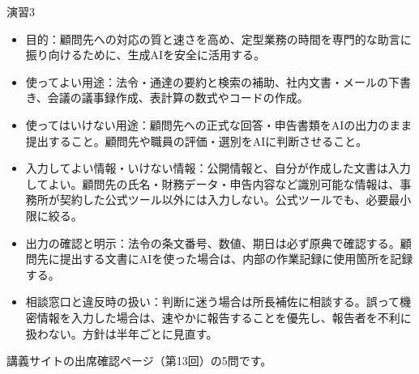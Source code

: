 \begin{answer}{演習3}
\begin{itemize}
  \item 目的：顧問先への対応の質と速さを高め、定型業務の時間を専門的な助言に振り向けるために、生成AIを安全に活用する。
  \item 使ってよい用途：法令・通達の要約と検索の補助、社内文書・メールの下書き、会議の議事録作成、表計算の数式やコードの作成。
  \item 使ってはいけない用途：顧問先への正式な回答・申告書類をAIの出力のまま提出すること。顧問先や職員の評価・選別をAIに判断させること。
  \item 入力してよい情報・いけない情報：公開情報と、自分が作成した文書は入力してよい。顧問先の氏名・財務データ・申告内容など識別可能な情報は、事務所が契約した公式ツール以外には入力しない。公式ツールでも、必要最小限に絞る。
  \item 出力の確認と明示：法令の条文番号、数値、期日は必ず原典で確認する。顧問先に提出する文書にAIを使った場合は、内部の作業記録に使用箇所を記録する。
  \item 相談窓口と違反時の扱い：判断に迷う場合は所長補佐に相談する。誤って機密情報を入力した場合は、速やかに報告することを優先し、報告者を不利に扱わない。方針は半年ごとに見直す。
\end{itemize}
\end{answer}

講義サイトの出席確認ページ（第13回）の5問です。

